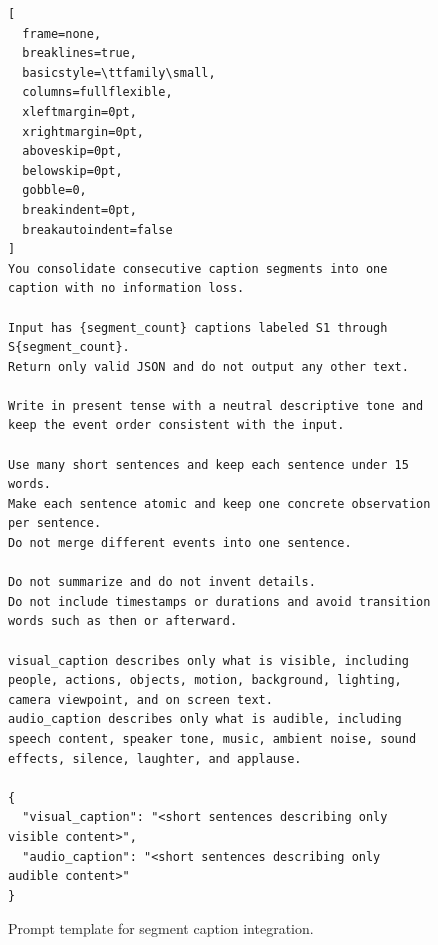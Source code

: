
\begin{figure}[t]
\centering
\begin{tcolorbox}[
  colback=blue!5!white,
  colframe=blue!75!black,
  width=\linewidth,
  arc=1mm,
  boxrule=0.8pt,
  title=\textbf{Segment Caption Integrator},
  colbacktitle=blue!75!black,
  coltitle=white,
  fonttitle=\bfseries\sffamily,
  halign title=center,
  top=4mm,
  bottom=4mm,
  left=3mm,
  right=3mm
]
\begin{lstlisting}[
  frame=none,
  breaklines=true,
  basicstyle=\ttfamily\small,
  columns=fullflexible,
  xleftmargin=0pt,
  xrightmargin=0pt,
  aboveskip=0pt,
  belowskip=0pt,
  gobble=0,
  breakindent=0pt,
  breakautoindent=false
]
You consolidate consecutive caption segments into one caption with no information loss.

Input has {segment_count} captions labeled S1 through S{segment_count}.
Return only valid JSON and do not output any other text.

Write in present tense with a neutral descriptive tone and keep the event order consistent with the input.

Use many short sentences and keep each sentence under 15 words.
Make each sentence atomic and keep one concrete observation per sentence.
Do not merge different events into one sentence.

Do not summarize and do not invent details.
Do not include timestamps or durations and avoid transition words such as then or afterward.

visual_caption describes only what is visible, including people, actions, objects, motion, background, lighting, camera viewpoint, and on screen text.
audio_caption describes only what is audible, including speech content, speaker tone, music, ambient noise, sound effects, silence, laughter, and applause.

{
  "visual_caption": "<short sentences describing only visible content>",
  "audio_caption": "<short sentences describing only audible content>"
}
\end{lstlisting}
\end{tcolorbox}
\caption{Prompt template for segment caption integration.}
\label{fig:caption_generation_prompt}
\end{figure}



